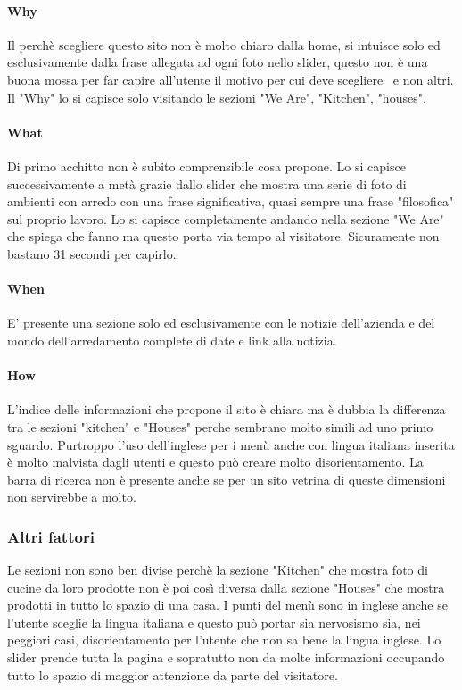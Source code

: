\documentclass[../Relazione.tex]{subfiles}
\begin{document}
            \paragraph{Why}
            Il perchè scegliere questo sito non è molto chiaro dalla home, si intuisce solo ed esclusivamente dalla frase allegata ad ogni foto nello slider, questo non è una buona mossa per far capire all'utente il motivo per cui deve scegliere \name\ e non altri.
            Il "Why" lo si capisce solo visitando le sezioni "We Are", "Kitchen", "houses".

            \paragraph{What}
             Di primo acchitto non è subito comprensibile cosa propone.
            Lo si capisce successivamente a metà grazie dallo slider che mostra una serie di foto di ambienti con arredo con una frase significativa, quasi sempre una frase "filosofica" sul proprio lavoro.
            Lo si capisce completamente andando nella sezione "We Are" che spiega che fanno ma questo porta via tempo al visitatore. Sicuramente non bastano 31 secondi per capirlo.
            
            
           

            \paragraph{When}
            E' presente una sezione solo ed esclusivamente con le notizie dell'azienda e del mondo dell'arredamento complete di date e link alla notizia.
            
            \paragraph{How}
            L'indice delle informazioni che propone il sito è chiara ma è dubbia la differenza tra le sezioni "kitchen" e "Houses" perche sembrano molto simili ad uno primo sguardo.
           Purtroppo l'uso dell'inglese per i menù anche con lingua italiana inserita è molto malvista dagli utenti e questo può creare molto disorientamento.
           La barra di ricerca non è presente anche se per un sito vetrina di queste dimensioni non servirebbe a molto.

        \subsubsection{Altri fattori}
            Le sezioni non sono ben divise perchè la sezione "Kitchen" che mostra foto di cucine da loro prodotte non è poi così diversa dalla sezione "Houses" che mostra prodotti in tutto lo spazio di una casa.
            I punti del menù sono in inglese anche se l'utente sceglie la lingua italiana e questo può portar sia nervosismo sia, nei peggiori casi, disorientamento per l'utente che non sa bene la lingua inglese.
            Lo slider prende tutta la pagina e sopratutto non da molte informazioni occupando tutto lo spazio di maggior attenzione da parte del visitatore.
\end{document}
